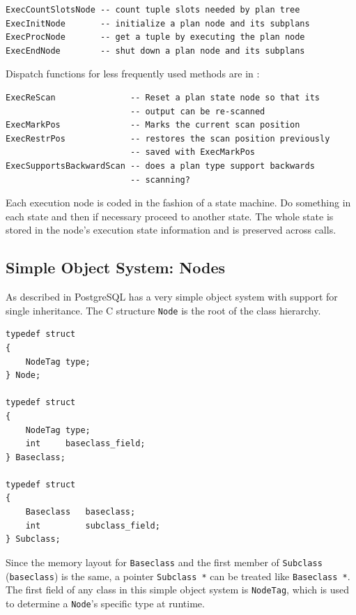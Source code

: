 \begin{lstlisting}[language=pseudo,numbers=none]
ExecCountSlotsNode -- count tuple slots needed by plan tree
ExecInitNode       -- initialize a plan node and its subplans
ExecProcNode       -- get a tuple by executing the plan node
ExecEndNode        -- shut down a plan node and its subplans
\end{lstlisting}

\noindent
Dispatch functions for less frequently used methods are in
:

\begin{lstlisting}[language=pseudo,numbers=none]
ExecReScan               -- Reset a plan state node so that its 
                         -- output can be re-scanned
ExecMarkPos              -- Marks the current scan position
ExecRestrPos             -- restores the scan position previously
                         -- saved with ExecMarkPos
ExecSupportsBackwardScan -- does a plan type support backwards
                         -- scanning?
\end{lstlisting}

\noindent
Each execution node is coded in the fashion of a state machine.  Do
something in each state and then if necessary proceed to another
state.  The whole state is stored in the node's execution state
information and is preserved across calls.

\subsection{Simple Object System: Nodes}
\label{sec:simple-object-system}
As described in \citep[Page 12-14]{Conway2006a} PostgreSQL has a very
simple object system with support for single inheritance.
The C structure \texttt{Node} is the root of the class hierarchy.

\pagebreak[2]

\begin{lstlisting}[language=pseudo,
caption={PostgreSQL's simple object system},
label={code:simple-object-system}
]
typedef struct
{
	NodeTag type;
} Node;

typedef struct
{
	NodeTag	type;
	int		baseclass_field;
} Baseclass;

typedef struct
{
	Baseclass	baseclass;
	int			subclass_field;
} Subclass;
\end{lstlisting}

Since the memory layout for \texttt{Baseclass} and the first member of
\texttt{Subclass} (\texttt{baseclass}) is the same, a pointer \texttt{Subclass *}
can be treated like \texttt{Baseclass *}.  The first field of any class
in this simple object system is \texttt{NodeTag}, which is used to determine
a \texttt{Node}'s specific type at runtime.

